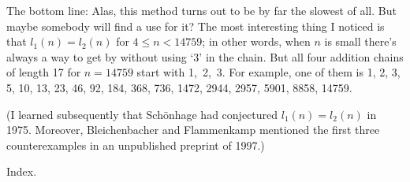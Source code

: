 The bottom line: Alas, this method turns out to be by far the
slowest of all. But maybe somebody will find a use for it?
The most interesting thing I noticed is that $l_1(n)=l_2(n)$
for $4\le n<14759$; in other words, when $n$ is small there's
always a way to get by without using `3' in the chain.
But all four addition chains of length 17 for $n=14759$
start with 1,~2,~3. For example, one of them is
1, 2, 3, 5, 10, 13, 23, 46, 92, 184, 368, 736, 1472, 2944, 2957, 5901, 8858,
14759.

(I learned subsequently that Sch\"onhage had conjectured $l_1(n)=l_2(n)$
in 1975. Moreover, Bleichenbacher and Flammenkamp mentioned
the first three counterexamples in an unpublished preprint of 1997.)

\fi

Index.
\fi

\inx
\fin
\con
